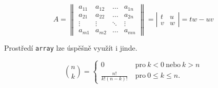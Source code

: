 \documentclass[a4paper, 11pt, twocolumn, final]{article}
\theoremstyle{definition}
\theoremstyle{plain}
\begin{document}
$$A = \left\| \begin{array}{cccc}
        a_{11} & a_{12} & \ldots & a_{1n} \\
        a_{21} & a_{22} & \ldots & a_{2n} \\
        \vdots & \vdots & \ddots & \vdots \\
        a_{m1} & a_{m2} & \ldots & a_{mn}
    \end{array} \right\| = \left| \begin{array}{rl}
        t & u \\
        v & w
    \end{array} \right| = tw {-} uv$$

Prostředí \texttt{array} lze úspěšně využít i jinde.

$$\binom{n}{k} = \left\{ \begin{array}{cl}
        0                   & \ \text{pro}\ k < 0\ \text{nebo}\ k > n \\
        \frac{n!}{k!(n-k)!} & \ \text{pro}\ 0 \leq k \leq n.
    \end{array} \right.$$
\end{document}
